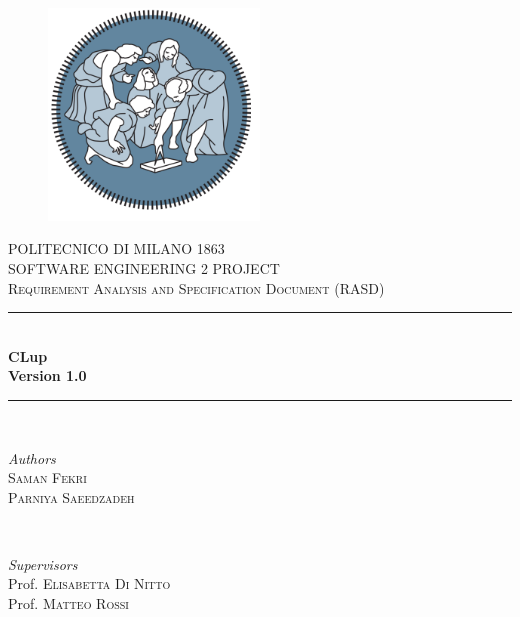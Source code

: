 \begin{titlepage}

	\center %

    \begin{figure}[H]
      \centering
      \includegraphics[width=0.5\textwidth,keepaspectratio]{images/PolimiLogo1.png}
    \end{figure}
    
	\textsc{\LARGE POLITECNICO DI MILANO 1863}\\[2cm]

	\textsc{\Large SOFTWARE ENGINEERING 2 PROJECT }\\[0.5cm]

	\textsc{\large Requirement Analysis and Specification Document (RASD)}\\[0.5cm]
	
	\rule{\linewidth}{0.5mm}\\[0.4cm]
	{\huge\bfseries CLup}\\[0.4cm]
	\textbf{Version 1.0}\\

	\rule{\linewidth}{0.5mm}\\[1.5cm]

	\begin{minipage}{0.4\textwidth}
		\begin{flushleft}
			\large
			\textit{Authors}\\
			 \textsc{Saman Fekri} \\
			 \textsc{Parniya Saeedzadeh}
		\end{flushleft}
	\end{minipage}
	~
	\begin{minipage}{0.5\textwidth}
		\begin{flushright}
			\large
			\textit{Supervisors}\\
			Prof. \textsc {Elisabetta Di Nitto}\\
			Prof. \textsc {Matteo Rossi}
		\end{flushright}
	\end{minipage}
	

\end{titlepage}
